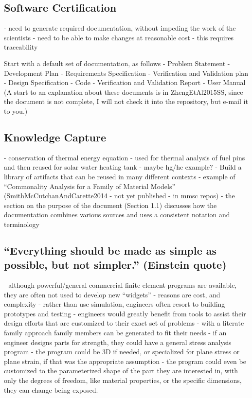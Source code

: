 \documentclass[10pt, preprint]{sigplanconf}
\begin{document}

\subsection{Software Certification}
\label{subsec:software}



- need to generate required documentation, without impeding the work of the scientists
- need to be able to make changes at reasonable cost - this requires traceability

Start with a default set of documentation, as follows
	- Problem Statement
	- Development Plan
	- Requirements Specification
	- Verification and Validation plan
	- Design Specification
	- Code
	- Verification and Validation Report
	- User Manual
(A start to an explanation about these documents is in ZhengEtAl2015SS, since the document is not complete, I will not check it into the repository, but e-mail it to you.)

\subsection{Knowledge Capture}
\label{subsec:knowledge}

- conservation of thermal energy equation - used for thermal analysis of fuel pins and then reused for solar water heating tank
- maybe hg/hc example?
- Build a library of artifacts that can be reused in many different contexts
- example of “Commonality Analysis for a Family of Material Models” (SmithMcCutchanAndCarette2014 - not yet published - in mmsc repos) - the section on the purpose of the document (Section 1.1) discusses how the documentation combines various sources and uses a consistent notation and terminology

\subsection{``Everything should be made as simple as possible, but not simpler.'' (Einstein quote)}
\label{subsec:everything}

- although powerful/general commercial finite element programs are available, they are often not used to develop new “widgets”
- reasons are cost, and complexity
- rather than use simulation, engineers often resort to building prototypes and testing
- engineers would greatly benefit from tools to assist their design efforts that are customized to their exact set of problems - with a literate family approach family members can be generated to fit their needs
- if an engineer designs parts for strength, they could have a general stress analysis program - the program could be 3D if needed, or specialized for plane stress or plane strain, if that was the appropriate assumption - the program could even be customized to the parameterized shape of the part they are interested in, with only the degrees of freedom, like material properties, or the specific dimensions, they can change being exposed.
\end{document}
